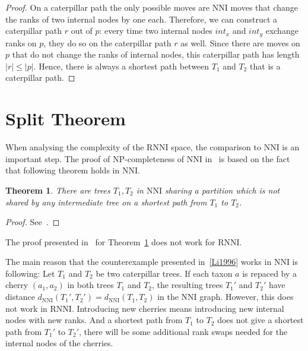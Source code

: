 \documentclass[11pt, a4paper]{article}
\newcommand{\nni}{\mathrm{NNI}}
\newcommand{\rnni}{\mathrm{RNNI}}
\newtheorem{theorem}[definition]{Theorem}
\begin{document}
\begin{proof}
	On a caterpillar path the only possible moves are $\nni$ moves that change the ranks of two internal nodes by one each.
	Therefore, we can construct a caterpillar path $r$ out of $p$:
	every time two internal nodes $int_x$ and $int_y$ exchange ranks on $p$, they do so on the caterpillar path $r$ as well.
	Since there are moves on $p$ that do not change the ranks of internal nodes, this caterpillar path has length $|r| \leq |p|$.
	Hence, there is always a shortest path between $T_1$ and $T_2$ that is a caterpillar path.
\end{proof}

\section{Split Theorem}

When analysing the complexity of the $\rnni$ space, the comparison to $\nni$ is an important step.
The proof of NP-completeness of $\nni$ in~\cite{jiang2000} is based on the fact that following theorem holds in $\nni$.

\begin{theorem}
	There are trees $T_1,T_2$ in $\nni$ sharing a partition which is not shared by any intermediate tree on a shortest path from $T_1$ to $T_2$.
	\label{thm:split_nni}
\end{theorem}

\begin{proof}
	See~\cite{Li1996}.
\end{proof}

The proof presented in~\cite{Li1996} for Theorem~\ref{thm:split_nni} does not work for $\rnni$.

The main reason that the counterexample presented in~\ref{Li1996} works in $\nni$ is following:
Let $T_1$ and $T_2$ be two caterpillar trees.
If each taxon $a$ is repaced by a cherry $(a_1,a_2)$ in both trees $T_1$ and $T_2$, the resulting trees $T_1'$ and $T_2'$ have distance $d_{\nni}(T_1',T_2') = d_{\nni}(T_1,T_2)$ in the $\nni$ graph.
However, this does not work in $\rnni$.
Introducing new cherries means introducing new internal nodes with new ranks.
And a shortest path from $T_1$ to $T_2$ does not give a shortest path from $T_1'$ to $T_2'$, there will be some additional rank swaps needed for the internal nodes of the cherries.
\end{document}
